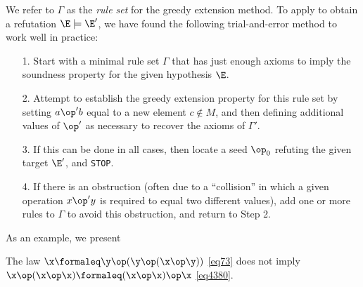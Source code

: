 We refer to $\Gamma$ as the \emph{rule set} for the greedy extension method. To apply  to obtain a refutation $\E \models {\E'}$, we have found the following trial-and-error method to work well in practice:
\begin{itemize}
\item[1.] Start with a minimal rule set $\Gamma$ that has just enough axioms to imply the soundness property for the given hypothesis $\E$.
\item[2.] Attempt to establish the greedy extension property for this rule set by setting $a \op' b$ equal to a new element $c \not \in M$, and then defining additional values of $\op'$ as necessary to recover the axioms of $\Gamma'$.
\item[3.]  If this can be done in all cases, then locate a seed $\op_0$ refuting the given target ${\E'}$, and \texttt{STOP}.
\item[4.]  If there is an obstruction (often due to a ``collision'' in which a given operation $x \op' y$ is required to equal two different values), add one or more rules to $\Gamma$ to avoid this obstruction, and return to Step 2.
\end{itemize}

As an example, we present

\begin{proposition}\label{73-4380} The law $\x \formaleq \y \op (\y \op (\x \op \y))$ \eqref{eq73} does not imply $\x \op (\x \op \x) \formaleq (\x \op \x) \op \x$ \eqref{eq4380}.
\end{proposition}

